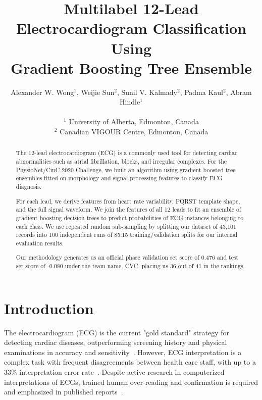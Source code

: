 \documentclass[twocolumn]{cinc}
\begin{document}


\title{Multilabel 12-Lead Electrocardiogram Classification Using \\
Gradient Boosting Tree Ensemble}

\author {Alexander W. Wong$^{1}$, Weijie Sun$^{2}$, Sunil V. Kalmady$^{2}$, Padma Kaul$^{2}$, Abram Hindle$^{1}$\\
\ \\
 $^1$ University of Alberta, Edmonton, Canada \\
$^2$ Canadian VIGOUR Centre, Edmonton, Canada }

\maketitle

\newcommand{\officialvalscore}{{0.476} }
\newcommand{\officialtestscore}{{-0.080} }

\begin{abstract}

The 12-lead electrocardiogram (ECG) is a commonly used tool for detecting cardiac abnormalities such as atrial fibrillation, blocks, and irregular complexes.
For the PhysioNet/CinC 2020 Challenge, we built an algorithm using gradient boosted tree ensembles fitted on morphology and signal processing features to classify ECG diagnosis.

For each lead, we derive features from heart rate variability, PQRST template shape, and the full signal waveform.
We join the features of all 12 leads to fit an ensemble of gradient boosting decision trees to predict probabilities of ECG instances belonging to each class.
We use repeated random sub-sampling by splitting our dataset of 43,101 records into 100 independent runs of 85:15 training/validation splits for our internal evaluation results.

Our methodology generates us an official phase validation set score of \officialvalscore and test set score of \officialtestscore under the team name, CVC, placing us 36 out of 41 in the rankings.

\end{abstract}

\section{Introduction}

The electrocardiogram (ECG) is the current "gold standard" strategy for detecting cardiac diseases, outperforming screening history and physical examinations in accuracy and sensitivity~\cite{harmon_effectiveness_2015}.
However, ECG interpretation is a complex task with frequent disagreements between health care staff, with up to a 33\% interpretation error rate~\cite{mele_improving_2008}.
Despite active research in computerized interpretations of ECGs, trained human over-reading and confirmation is required and emphasized in published reports~\cite{schlapfer_computer-interpreted_2017}.
\end{document}
